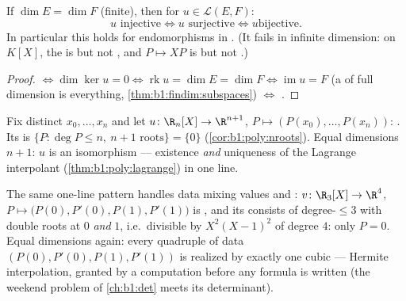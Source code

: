 \begin{corollary}\label{cor:b1:linmaps:samedim}
If $\dim E = \dim F$ (finite), then for $u \in \mathcal{L}(E, F)$:
\[
u \text{ injective} \iff u \text{ surjective} \iff u \text{
bijective}.
\]
In particular this holds for endomorphisms in . (It
fails in infinite dimension: on $K[X]$, the  is 
but not , and $P \mapsto XP$ is  but not
.)
\end{corollary}

\begin{proof}
 $\iff \dim\ker u = 0 \iff \operatorname{rk} u = \dim E =
\dim F \iff \operatorname{im} u = F$ (a  of full dimension
is everything, \cref{thm:b1:findim:subspaces}) $\iff$ .
\end{proof}

\begin{example}\label{ex:b1:linmaps:interpolation}
Fix distinct $x_0, \dots, x_n$ and let $u \colon \R_n[X] \to
\R^{n+1}$, $P \mapsto (P(x_0), \dots, P(x_n))$: . Its 
is $\{P : \deg P \leq n,\ n+1 \text{ roots}\} = \{0\}$
(\cref{cor:b1:poly:nroots}). Equal dimensions $n + 1$: $u$ is an
isomorphism --- existence \emph{and} uniqueness of the Lagrange
interpolant (\cref{thm:b1:poly:lagrange}) in one line.

The same one-line pattern handles data mixing values and
: $v \colon \R_3[X] \to \R^4$, $P \mapsto \bigl(P(0),
P'(0), P(1), P'(1)\bigr)$ is , and its  consists of
degree-$\leq 3$  with double roots at $0$ \emph{and}
$1$, i.e.\ divisible by $X^2(X-1)^2$ of degree $4$: only $P =
0$. Equal dimensions again: every quadruple of data $(P(0),
P'(0), P(1), P'(1))$ is realized by exactly one cubic ---
Hermite interpolation, granted by a  computation before
any formula is written (the weekend problem of \cref{ch:b1:det}
meets its determinant).
\end{example}

